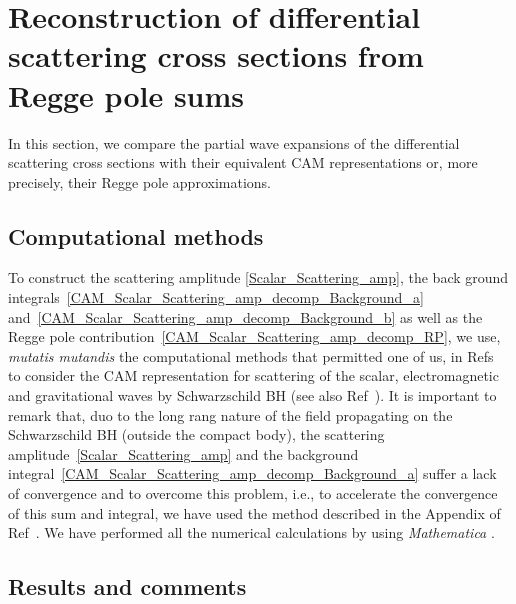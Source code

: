 \documentclass[aps,prd,longbibliography,reprint,twocolumn,amsmath,amssymb,amsfonts,showpacs,superscriptaddress]{revtex4-1}%
\begin{document}
\section{Reconstruction of differential scattering cross sections from Regge pole sums}
\label{SecIII}

In this section,  we compare the partial wave expansions of the differential scattering cross sections with their equivalent CAM representations or, more precisely, their Regge pole approximations.

\subsection{Computational methods}
\label{SecIIIa}

To construct the scattering amplitude \eqref{Scalar_Scattering_amp}, the back ground integrals~\eqref{CAM_Scalar_Scattering_amp_decomp_Background_a} and~\eqref{CAM_Scalar_Scattering_amp_decomp_Background_b} as well as the Regge pole contribution~\eqref{CAM_Scalar_Scattering_amp_decomp_RP}, we use, \textit{mutatis mutandis} the computational methods that permitted one of us, in Refs~\cite{Folacci:2019cmc,Folacci:2019vtt} to consider the CAM representation for scattering of the scalar, electromagnetic and gravitational waves by Schwarzschild BH (see also Ref~\cite{Dolan:2017rtj}). It is important to remark that, duo to the long rang nature of the field propagating on the Schwarzschild BH (outside the compact body), the scattering amplitude~\eqref{Scalar_Scattering_amp} and the background integral~\eqref{CAM_Scalar_Scattering_amp_decomp_Background_a} suffer a lack of convergence and to overcome this problem, i.e., to accelerate the convergence of this sum and integral, we have used the method described in the Appendix of Ref~\cite{Folacci:2019cmc}. We have performed all the numerical calculations by using {\it Mathematica} \cite{Mathematica}.


\subsection{Results and comments}
\label{SecIIIb}
\end{document}
